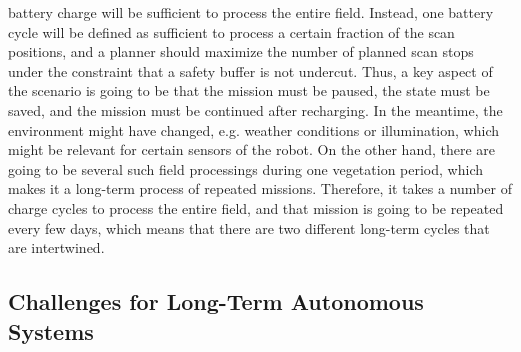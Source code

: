 \documentclass[english, master, expose, utf8]{base/thesis_KBS}
\begin{document}
battery charge will be sufficient to process the entire field. Instead, one battery cycle will be defined as sufficient to process a certain fraction of the scan
positions, and a planner should maximize the number of planned scan stops under the constraint that a safety buffer is not undercut.
Thus, a key aspect of the scenario is going to be that the mission must be paused, the state must be saved, and the mission must be continued after recharging.
In the meantime, the environment might have changed, e.g. weather conditions or illumination, which might be relevant for certain sensors of the robot.
On the other hand, there are going to be several such field processings during one vegetation period, which makes it a long-term process of repeated missions.
Therefore, it takes a number of charge cycles to process the entire field, and that mission is going to be repeated every few days,
which means that there are two different long-term cycles that are intertwined.\newline

\subsection{Challenges for Long-Term Autonomous Systems}
\label{sec:challenges_for_lta}
\end{document}
